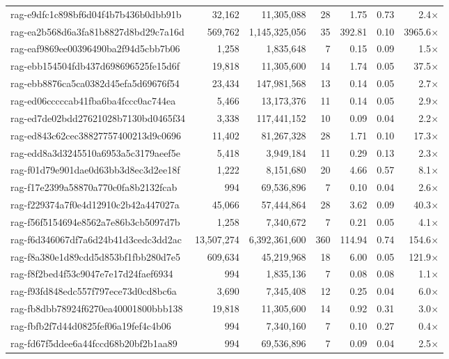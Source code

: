 \begin{table}[h!]
\begin{tabular}{lrrrrrr}
rag-e9dfc1c898bf6d04f4b7b436b0dbb91b & 32,162 & 11,305,088 & 28 & 1.75 & 0.73 & 2.4$\times$ \\
rag-ea2b568d6a3fa81b8827d8bd29c7a16d & 569,762 & 1,145,325,056 & 35 & 392.81 & 0.10 & 3965.6$\times$ \\
rag-eaf9869ee00396490ba2f94d5cbb7b06 & 1,258 & 1,835,648 & 7 & 0.15 & 0.09 & 1.5$\times$ \\
rag-ebb154504fdb437d698696525fe15d6f & 19,818 & 11,305,600 & 14 & 1.74 & 0.05 & 37.5$\times$ \\
rag-ebb8876ca5ca0382d45efa5d69676f54 & 23,434 & 147,981,568 & 13 & 0.14 & 0.05 & 2.7$\times$ \\
rag-ed06cccccab41fba6ba4fccc0ac744ea & 5,466 & 13,173,376 & 11 & 0.14 & 0.05 & 2.9$\times$ \\
rag-ed7de02bdd27621028b7130bd0465f34 & 3,338 & 117,441,152 & 10 & 0.09 & 0.04 & 2.2$\times$ \\
rag-ed843c62cec38827757400213d9c0696 & 11,402 & 81,267,328 & 28 & 1.71 & 0.10 & 17.3$\times$ \\
rag-edd8a3d3245510a6953a5c3179aeef5e & 5,418 & 3,949,184 & 11 & 0.29 & 0.13 & 2.3$\times$ \\
rag-f01d79e901dae0d63bb3d8ec3d2ee18f & 1,222 & 8,151,680 & 20 & 4.66 & 0.57 & 8.1$\times$ \\
rag-f17e2399a58870a770c0fa8b2132fcab & 994 & 69,536,896 & 7 & 0.10 & 0.04 & 2.6$\times$ \\
rag-f229374a7f0e4d12910c2b42a447027a & 45,066 & 57,444,864 & 28 & 3.62 & 0.09 & 40.3$\times$ \\
rag-f56f5154694e8562a7e86b3cb5097d7b & 1,258 & 7,340,672 & 7 & 0.21 & 0.05 & 4.1$\times$ \\
rag-f6d346067df7a6d24b41d3cedc3dd2ac & 13,507,274 & 6,392,361,600 & 360 & 114.94 & 0.74 & 154.6$\times$ \\
rag-f8a380e1d89cdd5d853bf1fbb280d7e5 & 609,634 & 45,219,968 & 18 & 6.00 & 0.05 & 121.9$\times$ \\
rag-f8f2bed4f53c9047e7e17d24faef6934 & 994 & 1,835,136 & 7 & 0.08 & 0.08 & 1.1$\times$ \\
rag-f93fd848edc557f797ece73d0cd8bc6a & 3,690 & 7,345,408 & 12 & 0.25 & 0.04 & 6.0$\times$ \\
rag-fb8dbb78924f6270ea40001800bbb138 & 19,818 & 11,305,600 & 14 & 0.92 & 0.31 & 3.0$\times$ \\
rag-fbfb2f7d44d0825fef06a19fef4c4b06 & 994 & 7,340,160 & 7 & 0.10 & 0.27 & 0.4$\times$ \\
rag-fd67f5ddee6a44fccd68b20bf2b1aa89 & 994 & 69,536,896 & 7 & 0.09 & 0.04 & 2.5$\times$ \\

\end{tabular}
\end{table}
